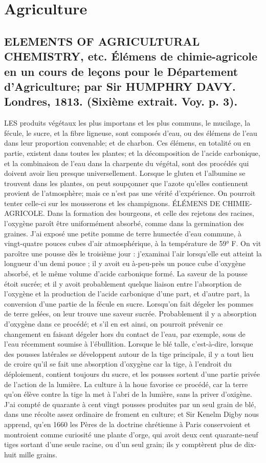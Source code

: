 \setcounter{page}{82}
\chapter{Agriculture}
\section{ELEMENTS OF AGRICULTURAL CHEMISTRY, etc. Élémens de chimie-agricole en un cours de leçons pour le Département d'Agriculture; par Sir HUMPHRY DAVY. Londres, 1813. \large{(Sixième extrait. Voy. p. 3).}}
LES produits végétaux les plus importans et les plus communs, le mucilage, la fécule, le sucre, et la fibre ligneuse, sont composés d'eau, ou des élémens de l'eau dans leur proportion convenable; et de charbon. Ces élémens, en totalité ou en partie, existent dans toutes les plantes; et la décomposition de l'acide carbonique, et la combinaison de l'eau dans la charpente du végétal, sont des procédés qui doivent avoir lieu presque universellement. Lorsque le gluten et l'albumine se trouvent dans les plantes, on peut soupçonner que l'azote qu'elles contiennent provient de l'atmosphère; mais ce n'est pas une vérité d'expérience. On pourroit tenter celle-ci sur les mousserons et les champignons.\setcounter{page}{83} ÉLÉMENS DE CHIMIE-AGRICOLE. Dans la formation des bourgeons, et celle des rejetons des racines, l'oxygène paroît être uniformément absorbé, comme dans la germination des graines. J'ai exposé une petite pomme de terre humectée d'eau commune, à vingt-quatre pouces cubes d'air atmosphérique, à la température de 59° F. On vit paroître une pousse dès le troisième jour : j'examinai l'air lorsqu'elle eut atteint la longueur d'un demi pouce ; il y avoit eu à-peu-près un pouce cube d'oxygène absorbé, et le même volume d'acide carbonique formé. La saveur de la pousse étoit sucrée; et il y avoit probablement quelque liaison entre l'absorption de l'oxygène et la production de l'acide carbonique d'une part, et d'autre part, la conversion d'une partie de la fécule en sucre. Lorsqu'on fait dégeler les pommes de terre gelées, on leur trouve une saveur sucrée. Probablement il y a absorption d'oxygène dans ce procédé; et s'il en est ainsi, on pourroit prévenir ce changement en faisant dégeler hors du contact de l'eau, par exemple, sous de l'eau récemment soumise à l'ébullition. Lorsque le blé talle, c'est-à-dire, lorsque des pousses latérales se développent autour de la tige principale, il y a tout lieu de croire qu'il se fait une absorption d'oxygène\setcounter{page}{84} car la tige, à l'endroit du déploiement, contient toujours du sucre, et les pousses sortent d'une partie privée de l'action de la lumière. La culture à la houe favorise ce procédé, car la terre qu'on élève contre la tige la met à l'abri de la lumière, sans la priver d'oxigène. J'ai compté de quarante à cent vingt pousses produites par un seul grain de blé, dans une récolte assez ordinaire de froment en culture; et Sir Kenelm Digby nous apprend, qu'en 1660 les Pères de la doctrine chrétienne à Paris conservoient et montroient comme curiosité une plante d'orge, qui avoit deux cent quarante-neuf tiges sortant d'une seule racine, ou d'un seul grain; ils y comptèrent plus de dix-huit mille grains.
